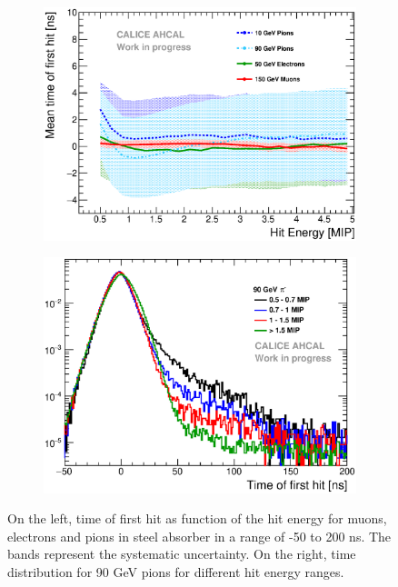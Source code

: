 \begin{figure}[htbp!]
	\begin{subfigure}[t]{0.49\textwidth}
		\centering
		\includegraphics[width=1\textwidth]{../Thesis_Plots/Timing/Pions/Plots/Timing_Energy_Comparison_ShortAsymRange.eps}
		\caption{} \label{fig:Energy_Comparison}
	\end{subfigure}
	\hfill
	\begin{subfigure}[t]{0.49\textwidth}
		\centering
		\includegraphics[width=1\textwidth]{../Thesis_Plots/Timing/Pions/Plots/TimeEnergyBinsPions.eps}
		\caption{} \label{fig:TimeBinsEnergy}
	\end{subfigure}
	\caption{On the left, time of first hit as function of the hit energy for muons, electrons and pions in steel absorber in a range of -50 to 200 ns. The bands represent the systematic uncertainty. On the right, time distribution for 90 GeV pions for different hit energy ranges.}
\end{figure}

